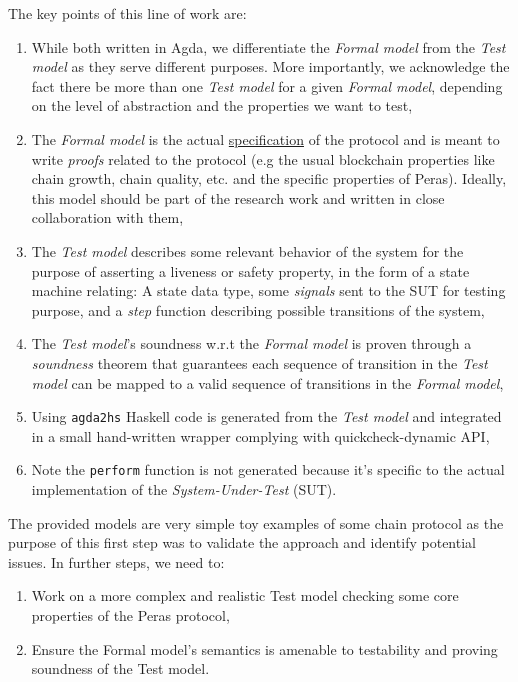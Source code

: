 \documentclass[10pt]{article}
\providecommand{\tightlist}{%
  \setlength{\itemsep}{0pt}\setlength{\parskip}{0pt}}
\begin{document}
The key points of this line of work are:

\begin{enumerate}
\def\labelenumi{\arabic{enumi}.}
\tightlist
\item
  While both written in Agda, we differentiate the \emph{Formal model}
  from the \emph{Test model} as they serve different purposes. More
  importantly, we acknowledge the fact there be more than one \emph{Test
  model} for a given \emph{Formal model}, depending on the level of
  abstraction and the properties we want to test,
\item
  The \emph{Formal model} is the actual
  \hyperref[agda-specification]{specification} of the protocol and is
  meant to write \emph{proofs} related to the protocol (e.g the usual
  blockchain properties like chain growth, chain quality, etc. and the
  specific properties of Peras). Ideally, this model should be part of
  the research work and written in close collaboration with them,
\item
  The \emph{Test model} describes some relevant behavior of the system
  for the purpose of asserting a liveness or safety property, in the
  form of a state machine relating: A state data type, some
  \emph{signals} sent to the SUT for testing purpose, and a \emph{step}
  function describing possible transitions of the system,
\item
  The \emph{Test model}'s soundness w.r.t the \emph{Formal model} is
  proven through a \emph{soundness} theorem that guarantees each
  sequence of transition in the \emph{Test model} can be mapped to a
  valid sequence of transitions in the \emph{Formal model},
\item
  Using \texttt{agda2hs} Haskell code is generated from the \emph{Test
  model} and integrated in a small hand-written wrapper complying with
  quickcheck-dynamic API,
\item
  Note the \texttt{perform} function is not generated because it's
  specific to the actual implementation of the \emph{System-Under-Test}
  (SUT).
\end{enumerate}

The provided models are very simple toy examples of some chain protocol
as the purpose of this first step was to validate the approach and
identify potential issues. In further steps, we need to:

\begin{enumerate}
\def\labelenumi{\arabic{enumi}.}
\tightlist
\item
  Work on a more complex and realistic Test model checking some core
  properties of the Peras protocol,
\item
  Ensure the Formal model's semantics is amenable to testability and
  proving soundness of the Test model.
\end{enumerate}
\end{document}
